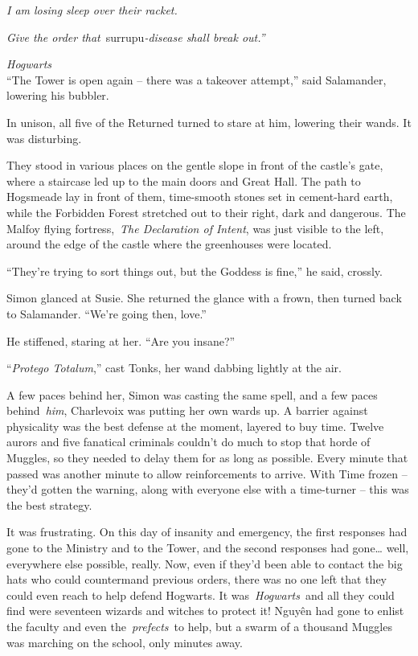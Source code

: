 \emph{I am losing sleep over their racket.}

\emph{Give the order that}~surrupu\emph{-disease shall break out.''}\\


\mybreak

\emph{Hogwarts}\\

``The Tower is open again -- there was a takeover attempt,'' said
Salamander, lowering his bubbler.

In unison, all five of the Returned turned to stare at him, lowering
their wands. It was disturbing.

They stood in various places on the gentle slope in front of the
castle's gate, where a staircase led up to the main doors and Great
Hall. The path to Hogsmeade lay in front of them, time-smooth stones set
in cement-hard earth, while the Forbidden Forest stretched out to their
right, dark and dangerous. The Malfoy flying fortress,~\emph{The
Declaration of Intent}, was just visible to the left, around the edge of
the castle where the greenhouses were located.

``They're trying to sort things out, but the Goddess is fine,'' he said,
crossly.

Simon glanced at Susie. She returned the glance with a frown, then
turned back to Salamander. ``We're going then, love.''

He stiffened, staring at her. ``Are you insane?''

``\emph{Protego Totalum},'' cast Tonks, her wand dabbing lightly at the
air.

A few paces behind her, Simon was casting the same spell, and a few
paces behind~\emph{him}, Charlevoix was putting her own wards up. A
barrier against physicality was the best defense at the moment, layered
to buy time. Twelve aurors and five fanatical criminals couldn't do much
to stop that horde of Muggles, so they needed to delay them for as long
as possible. Every minute that passed was another minute to allow
reinforcements to arrive. With Time frozen -- they'd gotten the warning,
along with everyone else with a time-turner -- this was the best
strategy.

It was frustrating. On this day of insanity and emergency, the first
responses had gone to the Ministry and to the Tower, and the second
responses had gone\ldots{} well, everywhere else possible, really. Now,
even if they'd been able to contact the big hats who could countermand
previous orders, there was no one left that they could even reach to
help defend Hogwarts. It was~\emph{Hogwarts}~and all they could find
were seventeen wizards and witches to protect it!
Nguy\makebox[0pt][l]{\raisebox{0.5ex}{˜}}ên had gone to enlist the
faculty and even the~\emph{prefects}~to help, but a swarm of a thousand
Muggles was marching on the school, only minutes away.

